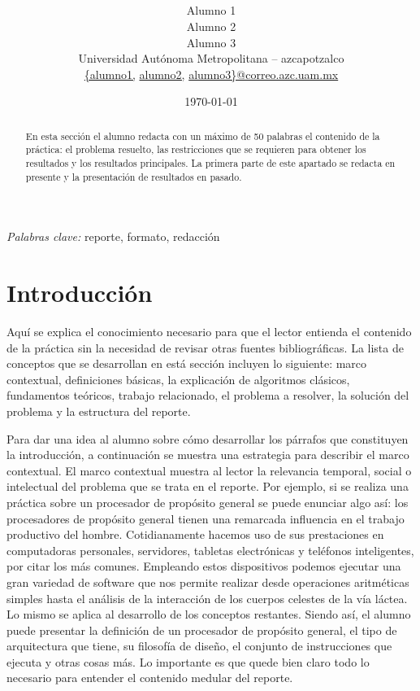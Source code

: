 \documentclass[12pt]{article}
\title{
   \blue{\textbf{Título del reporte no muy largo}}\\[-0.25cm] %
   \gray{\large Nombre de la UEA}\\ %
}
\author{Alumno 1\\ %
        Alumno 2\\
        Alumno 3\\
        Universidad Autónoma Metropolitana -- azcapotzalco\\  %
        \href{mailto:alumno1@azc.uam.mx}{\{alumno1,}
        \href{mailto:alumno2@azc.uam.mx}{alumno2,}
        \href{mailto:alumno3@azc.uam.mx}{alumno3\}@correo.azc.uam.mx}
}
\date{\today} %
\begin{document}
\maketitle %


\begin{abstract}
\noindent En esta sección el alumno redacta con un máximo de 50 palabras el contenido de la práctica: el problema resuelto, las restricciones que se requieren para obtener los resultados y los resultados principales. La primera parte de este apartado se redacta en presente y la presentación de resultados en pasado.
\end{abstract}

\hspace*{3,6mm}\textit{Palabras clave:} reporte, formato, redacción%


\section{Introducción}

Aquí se explica el conocimiento necesario para que el lector entienda el 
contenido de la práctica sin la necesidad de revisar otras fuentes 
bibliográficas. La lista de conceptos que se desarrollan en está sección 
incluyen lo siguiente: marco contextual, definiciones básicas, la explicación 
de algoritmos clásicos, fundamentos teóricos, trabajo relacionado, el problema 
a resolver, la solución del problema y la estructura del reporte.

Para dar una idea al alumno sobre cómo desarrollar los párrafos que constituyen 
la introducción, a continuación se muestra una estrategia para describir el 
marco contextual. El marco contextual muestra al lector la relevancia temporal,
social o intelectual del problema que se trata en el reporte. Por ejemplo, si
se realiza una práctica sobre un procesador de propósito general se puede 
enunciar algo así: los procesadores de propósito general tienen una remarcada 
influencia en el trabajo productivo del hombre. Cotidianamente hacemos uso de 
sus prestaciones en computadoras personales, servidores, tabletas electrónicas 
y teléfonos inteligentes, por citar los más comunes. Empleando estos 
dispositivos podemos ejecutar una gran variedad de software que nos permite 
realizar desde operaciones aritméticas simples hasta el análisis de la 
interacción de los cuerpos celestes de la vía láctea. Lo mismo se aplica al 
desarrollo de los conceptos restantes. Siendo así, el alumno puede presentar 
la definición de un procesador de propósito general, el tipo de arquitectura 
que tiene, su filosofía de diseño, el conjunto de instrucciones que ejecuta y 
otras cosas más. Lo importante es que quede bien claro todo lo necesario para 
entender el contenido medular del reporte.
\end{document}
